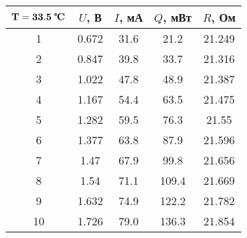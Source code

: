 \begin{tabular}{ccccc}
\toprule
$\mathbf{T = 33.5}\;\textbf{\textcelsius}$ & $U$, В & $I$, мА & $Q$, мВт & $R$, Ом \\
\midrule
1 & 0.672 & 31.6 & 21.2 & 21.249 \\
2 & 0.847 & 39.8 & 33.7 & 21.316 \\
3 & 1.022 & 47.8 & 48.9 & 21.387 \\
4 & 1.167 & 54.4 & 63.5 & 21.475 \\
5 & 1.282 & 59.5 & 76.3 & 21.55 \\
6 & 1.377 & 63.8 & 87.9 & 21.596 \\
7 & 1.47 & 67.9 & 99.8 & 21.656 \\
8 & 1.54 & 71.1 & 109.4 & 21.669 \\
9 & 1.632 & 74.9 & 122.2 & 21.782 \\
10 & 1.726 & 79.0 & 136.3 & 21.854 \\
\bottomrule
\end{tabular}
